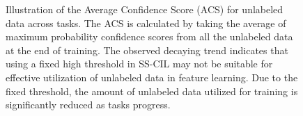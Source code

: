\documentclass{article}
\begin{document}
\begin{figure}[h]
    \caption{Illustration of the Average Confidence Score (ACS) for unlabeled data across tasks. The ACS is calculated by taking the average of maximum probability confidence scores from all the unlabeled data at the end of training. The observed decaying trend indicates that using a fixed high threshold in SS-CIL may not be suitable for effective utilization of unlabeled data in feature learning. Due to the fixed threshold, the amount of unlabeled data utilized for training is significantly reduced as tasks progress.}
    \label{fig:acs_trend}
\end{figure}
\end{document}
